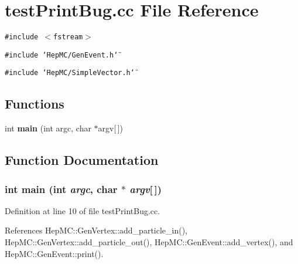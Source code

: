 \section{test\-Print\-Bug.cc File Reference}
\label{testPrintBug_8cc}
{\tt \#include $<$fstream$>$}\par
{\tt \#include \char`\"{}Hep\-MC/Gen\-Event.h\char`\"{}}\par
{\tt \#include \char`\"{}Hep\-MC/Simple\-Vector.h\char`\"{}}\par
\subsection*{Functions}
\begin{CompactItemize}
\item 
int {\bf main} (int argc, char $\ast$argv[$\,$])
\end{CompactItemize}


\subsection{Function Documentation}
\subsubsection{\setlength{\rightskip}{0pt plus 5cm}int main (int {\em argc}, char $\ast$ {\em argv}[$\,$])}\label{testPrintBug_8cc_0ddf1224851353fc92bfbff6f499fa97}




Definition at line 10 of file test\-Print\-Bug.cc.

References Hep\-MC::Gen\-Vertex::add\_\-particle\_\-in(), Hep\-MC::Gen\-Vertex::add\_\-particle\_\-out(), Hep\-MC::Gen\-Event::add\_\-vertex(), and Hep\-MC::Gen\-Event::print().